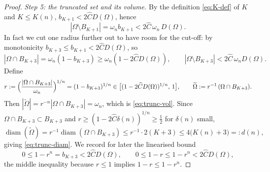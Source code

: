 \documentclass[11pt]{amsart}
\theoremstyle{definition}
\newcommand{\Om}{\Omega}
\newcommand{\abs}[1]{\left|#1\right|}
\newcommand{\Otilde}{\widetilde{\Omega}}
\DeclareMathOperator{\diam}{diam}
\begin{document}
\begin{proof}
\smallskip
\emph{Step 5: the truncated set and its volume.}
By the definition \eqref{eq:K-def} of $K$ and $K\le K(n)$,
$b_{K+1}<2\widehat C D(\Om)$, hence
\begin{equation}\label{eq:tail-controlled}
   \abs{\Om\setminus B_{K+1}}=\omega_n b_{K+1}<2\widehat C\,\omega_n\,D(\Om).
\end{equation}
In fact we cut one radius further out to have room for the cut-off: by
monotonicity $b_{K+3}\le b_{K+1}<2\widehat C D(\Om)$, so
\begin{equation}\label{eq:vol-cut}
   \abs{\Om\cap B_{K+3}}=\omega_n(1-b_{K+3})\ge\omega_n(1-2\widehat C D(\Om)),
   \qquad
   \abs{\Om\setminus B_{K+3}}<2\widehat C\,\omega_n D(\Om).
\end{equation}
Define
\[
   r:=\Bigl(\frac{\abs{\Om\cap B_{K+3}}}{\omega_n}\Bigr)^{1/n}
   =(1-b_{K+3})^{1/n}\in\bigl[(1-2\widehat C D(\Om))^{1/n},\,1\bigr],
   \qquad
   \Otilde:=r^{-1}\,(\Om\cap B_{K+3}).
\]
Then $\abs{\Otilde}=r^{-n}\abs{\Om\cap B_{K+3}}=\omega_n$, which is
\eqref{eq:trunc-vol}.
Since $\Om\cap B_{K+3}\subset B_{K+3}$ and
$r\ge(1-2\widehat C\delta(n))^{1/n}\ge\tfrac12$ for $\delta(n)$ small,
\[
   \diam(\Otilde)=r^{-1}\diam(\Om\cap B_{K+3})\le r^{-1}\cdot2(K+3)
   \le4\bigl(K(n)+3\bigr)=:d(n),
\]
giving \eqref{eq:trunc-diam}.
We record for later the linearised bound
\begin{equation}\label{eq:r-near-1}
   0\le1-r^n=b_{K+3}<2\widehat C D(\Om),
   \qquad
   0\le1-r\le1-r^n<2\widehat C D(\Om),
\end{equation}
the middle inequality because $r\le1$ implies $1-r\le1-r^n$.


\end{proof}
\end{document}

